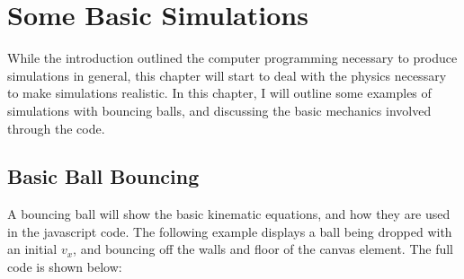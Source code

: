 
\chapter{Some Basic Simulations} %

\label{Chapter1} %




While the introduction outlined the computer programming necessary to produce simulations in general, this chapter will start to deal with the physics necessary to make simulations realistic.  In this chapter, I will outline some examples of simulations with bouncing balls, and discussing the basic mechanics involved through the code.



\section{Basic Ball Bouncing}

A bouncing ball will show the basic kinematic equations, and how they are used in the javascript code.  The following example displays a ball being dropped with an initial $v_x$, and bouncing off the walls and floor of the canvas element.  The full code is shown below:




